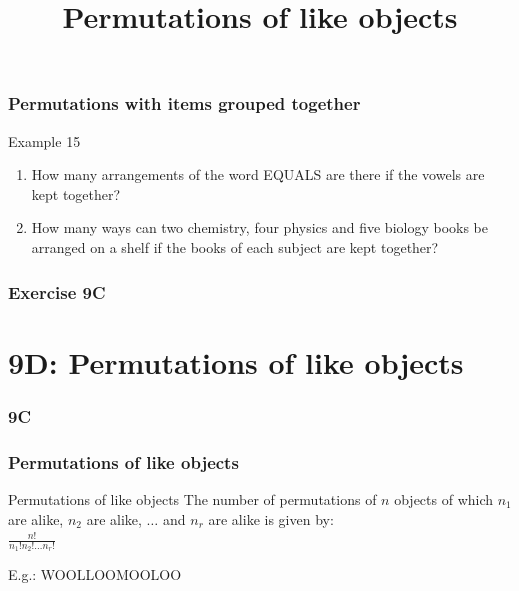\documentclass[
	11pt, %
]{beamer}
\begin{document}
\begin{frame}[t]
    \frametitle{Permutations with items grouped together}
    \begin{block}{Example 15}
        \begin{enumerate}
            \item How many arrangements of the word EQUALS are there if the vowels are kept together?
            \item How many ways can two chemistry, four physics and five biology books be arranged on a shelf if 
            the books of each subject are kept together?
        \end{enumerate}        
    \end{block}
\end{frame}

\begin{frame}
    \frametitle{Exercise 9C}
\end{frame}


\section{9D: Permutations of like objects}
\begin{frame}
    \frametitle{9C}
    \begin{center}
        \title{Permutations of like objects}
        \maketitle
    \end{center}
\end{frame}

\begin{frame}
    \frametitle{Permutations of like objects}
    \begin{block}{Permutations of like objects}
        The number of permutations of $n$ objects of which $n_1$ are alike, $n_2$ are alike, $\dots$ and $n_r$ are alike 
        is given by:\\
        $\frac{n!}{n_1!n_2!\dots n_r!}$
    \end{block}
    E.g.: WOOLLOOMOOLOO
\end{frame}
\end{document}
